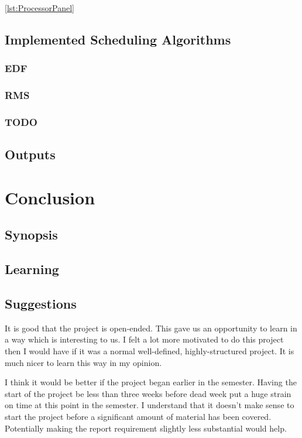 \documentclass{article} %
\begin{document}
\ref{lst:ProcessorPanel}

\subsection{Implemented Scheduling Algorithms}
\subsubsection{EDF}

\subsubsection{RMS}

\subsubsection{TODO}

\subsection{Outputs}

\section{Conclusion}
\subsection{Synopsis}

\subsection{Learning}

\subsection{Suggestions}
It is good that the project is open-ended.
This gave us an opportunity to learn in a way which is interesting to us.
I felt a lot more motivated to do this project then I would have if it was a normal well-defined, highly-structured project.
It is much nicer to learn this way in my opinion.

I think it would be better if the project began earlier in the semester.
Having the start of the project be less than three weeks before dead week put a huge strain on time at this point in the semester.
I understand that it doesn't make sense to start the project before a significant amount of material has been covered.
Potentially making the report requirement slightly less substantial would help.




\end{document}
